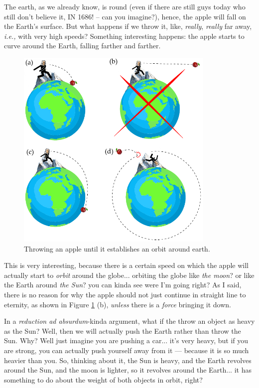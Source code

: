 \documentclass[preprint,12pt]{elsarticle}
\begin{document}
The earth, as we already know, is round (even if there are still guys today who still don't believe it, IN 1686! -- can you imagine?), hence, the apple will fall on the Earth's surface. But what happens if we throw it, like, \emph{really}, \emph{really} far away, \emph{i.e.,} with very high speeds? Something interesting happens: the apple starts to curve around the Earth, falling farther and farther.

\begin{figure}[!ht]
    \centering
    \includegraphics[width=0.85\textwidth]{figures/throwing_apple.pdf}
    \caption{Throwing an apple until it establishes an orbit around earth.}
    \label{fig:apple_throw}
\end{figure}

This is very interesting, because there is a certain speed on which the apple will actually start to \emph{orbit} around the globe... orbiting the globe like \emph{the moon}? or like the Earth around \emph{the Sun}? you can kinda see were I'm going right? As I said, there is no reason for why the apple should not just continue in straight line to eternity, as shown in Figure \ref{fig:apple_throw} (b), \emph{unless} there is a \emph{force} bringing it down. 

In a \emph{reduction ad absurdum}-kinda argument, what if the throw an object as heavy as the Sun? Well, then we will actually push the Earth rather than throw the Sun. Why? Well just imagine you are pushing a car... it's very heavy, but if you are strong, you can actually push yourself away from it --- because it is so much heavier than you. So, thinking about it, the Sun is heavy, and the Earth revolves around the Sun, and the moon is lighter, so it revolves around the Earth... it has something to do about the weight of both objects in orbit, right?
\end{document}
